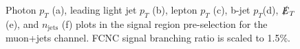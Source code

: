 \begin{figure}[h!]
\hfil
{}
\caption{Photon $p_T$ (a), leading light jet $p_T$ (b), lepton $p_T$ (c), b-jet $p_T$(d), $\slashed{E}_T$ (e), and $n_{\text{jets}}$ (f) plots in the signal region pre-selection for the muon+jets channel.  FCNC signal branching ratio is scaled to 1.5\%.}
\label{fig:PreSelPlots3}
\end{figure}

